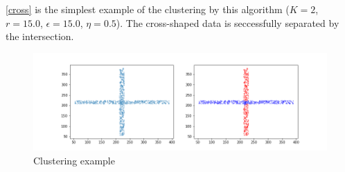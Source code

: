 \autoref{cross} is the simplest example of the clustering by this algorithm ($K = 2$, $r = 15.0$, $\epsilon = 15.0$, $\eta = 0.5$).
The cross-shaped data is seccessfully separated by the intersection.

\begin{figure}[htbp]
\centering
\vspace{-1em}
\includegraphics[width=0.8  \textwidth]{cross_shaped.png}
\vspace{-1em}
\caption{Clustering example}
\label{cross}
\end{figure}


%   